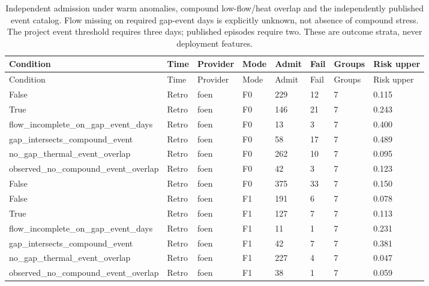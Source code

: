 {\tabletext
\setlength{\tabcolsep}{3pt}
\begin{longtable}{p{}p{}p{}p{}p{}p{}p{}p{}}
\caption{Independent admission under warm anomalies, compound low-flow/heat overlap and the independently published event catalog. Flow missing on required gap-event days is explicitly unknown, not absence of compound stress. The project event threshold requires three days; published episodes require two. These are outcome strata, never deployment features.}\label{tab:r3si-anomalies}\\
\toprule
Condition & Time & Provider & Mode & Admit & Fail & Groups & Risk upper \\
\midrule
\endfirsthead
\toprule
Condition & Time & Provider & Mode & Admit & Fail & Groups & Risk upper \\
\midrule
\endhead
False & Retro & foen & F0 & 229 & 12 & 7 & 0.115 \\
True & Retro & foen & F0 & 146 & 21 & 7 & 0.243 \\
flow\_\allowbreak incomplete\_\allowbreak on\_\allowbreak gap\_\allowbreak event\_\allowbreak days & Retro & foen & F0 & 13 & 3 & 7 & 0.400 \\
gap\_\allowbreak intersects\_\allowbreak compound\_\allowbreak event & Retro & foen & F0 & 58 & 17 & 7 & 0.489 \\
no\_\allowbreak gap\_\allowbreak thermal\_\allowbreak event\_\allowbreak overlap & Retro & foen & F0 & 262 & 10 & 7 & 0.095 \\
observed\_\allowbreak no\_\allowbreak compound\_\allowbreak event\_\allowbreak overlap & Retro & foen & F0 & 42 & 3 & 7 & 0.123 \\
False & Retro & foen & F0 & 375 & 33 & 7 & 0.150 \\
False & Retro & foen & F1 & 191 & 6 & 7 & 0.078 \\
True & Retro & foen & F1 & 127 & 7 & 7 & 0.113 \\
flow\_\allowbreak incomplete\_\allowbreak on\_\allowbreak gap\_\allowbreak event\_\allowbreak days & Retro & foen & F1 & 11 & 1 & 7 & 0.231 \\
gap\_\allowbreak intersects\_\allowbreak compound\_\allowbreak event & Retro & foen & F1 & 42 & 7 & 7 & 0.381 \\
no\_\allowbreak gap\_\allowbreak thermal\_\allowbreak event\_\allowbreak overlap & Retro & foen & F1 & 227 & 4 & 7 & 0.047 \\
observed\_\allowbreak no\_\allowbreak compound\_\allowbreak event\_\allowbreak overlap & Retro & foen & F1 & 38 & 1 & 7 & 0.059 \\

\end{longtable}}

